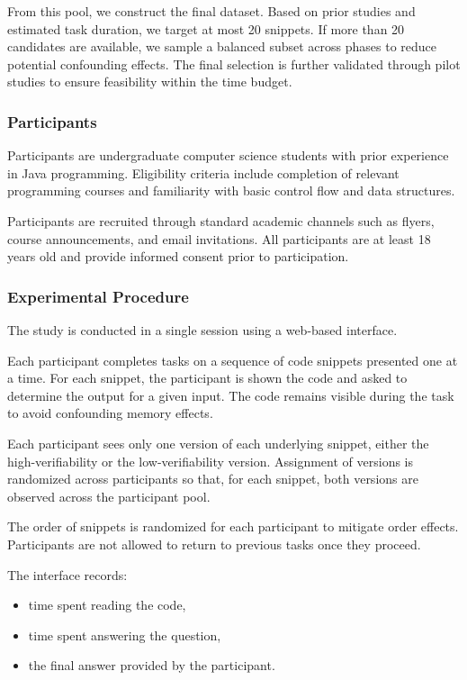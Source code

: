 From this pool, we construct the final dataset. Based on prior studies and estimated task duration, we target at most 20 snippets. If more than 20 candidates are available, we sample a balanced subset across phases to reduce potential confounding effects. The final selection is further validated through pilot studies to ensure feasibility within the time budget.

\subsubsection{Participants}

Participants are undergraduate computer science students with prior experience in Java programming. Eligibility criteria include completion of relevant programming courses and familiarity with basic control flow and data structures.

Participants are recruited through standard academic channels such as flyers, course announcements, and email invitations. All participants are at least 18 years old and provide informed consent prior to participation.

\subsubsection{Experimental Procedure}

The study is conducted in a single session using a web-based interface.

Each participant completes tasks on a sequence of code snippets presented one at a time. For each snippet, the participant is shown the code and asked to determine the output for a given input. The code remains visible during the task to avoid confounding memory effects.

Each participant sees only one version of each underlying snippet, either the high-verifiability or the low-verifiability version. Assignment of versions is randomized across participants so that, for each snippet, both versions are observed across the participant pool.

The order of snippets is randomized for each participant to mitigate order effects. Participants are not allowed to return to previous tasks once they proceed.

The interface records:
\begin{itemize}
    \item time spent reading the code,
    \item time spent answering the question,
    \item the final answer provided by the participant.
\end{itemize}

